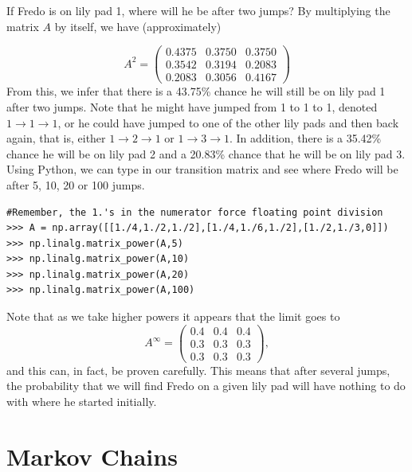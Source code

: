 If Fredo is on lily pad 1, where will he be after two jumps?
By multiplying the matrix $A$ by itself, we have (approximately)

\[
A^2 = \begin{pmatrix}
0.4375 & 0.3750 & 0.3750\\
0.3542 & 0.3194 & 0.2083\\
0.2083 & 0.3056 & 0.4167
\end{pmatrix}
\]
From this, we infer that there is a 43.75\% chance he will still be on lily pad 1 after two jumps.
Note that he might have jumped from 1 to 1 to 1, denoted $1 \rightarrow 1 \rightarrow 1$, or he could have jumped to one of the other lily pads and then back again, that is, either $1 \rightarrow 2 \rightarrow 1$ or $1 \rightarrow 3 \rightarrow 1$.
In addition, there is a 35.42\% chance he will be on lily pad 2 and a 20.83\% chance that he will be on lily pad 3.
Using Python, we can type in our transition matrix and see where Fredo will be after 5, 10, 20 or 100 jumps.

\begin{lstlisting}
#Remember, the 1.'s in the numerator force floating point division
>>> A = np.array([[1./4,1./2,1./2],[1./4,1./6,1./2],[1./2,1./3,0]])
>>> np.linalg.matrix_power(A,5)
>>> np.linalg.matrix_power(A,10)
>>> np.linalg.matrix_power(A,20)
>>> np.linalg.matrix_power(A,100)
\end{lstlisting}

Note that as we take higher powers it appears that the limit goes to
\[
A^\infty = \begin{pmatrix}
0.4 & 0.4 & 0.4\\
0.3 & 0.3 & 0.3\\
0.3 & 0.3 & 0.3
\end{pmatrix},
\]
and this can, in fact, be proven carefully.
This means that after several jumps, the probability that we will find Fredo on a given lily pad will have nothing to do with where he started initially.

\section*{Markov Chains}

